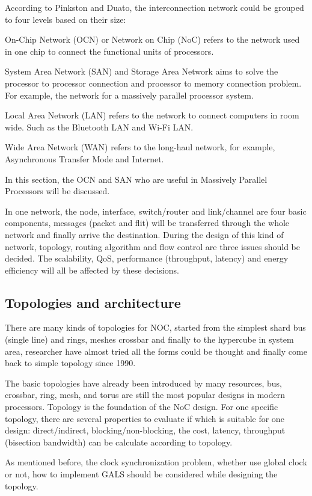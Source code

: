 \par According to Pinkston and Duato\cite{hennessy2017computer}, the interconnection network could be grouped to four levels based on their size: 
\par On-Chip Network (OCN) or Network on Chip (NoC) refers to the network used in one chip to connect the functional units of processors. 
\par System Area Network (SAN) and Storage Area Network aims to solve the processor to processor connection and processor to memory connection problem. For example, the network for a massively parallel processor system.
\par Local Area Network (LAN) refers to the network to connect computers in room wide. Such as the Bluetooth LAN and Wi-Fi LAN.
\par Wide Area Network (WAN) refers to the long-haul network, for example, Asynchronous Transfer Mode and Internet.
\par In this section, the OCN and SAN who are useful in Massively Parallel Processors will be discussed.
\par In one network, the node, interface, switch/router and link/channel are four basic components, messages (packet and flit) will be transferred through the whole network and finally arrive the destination. During the design of this kind of network, topology, routing algorithm and flow control are three issues should be decided. The scalability, QoS, performance (throughput, latency) and energy efficiency will all be affected by these decisions.

\subsection{Topologies and architecture}
\par There are many kinds of topologies for NOC, started from the simplest shard bus (single line) and rings, meshes crossbar and finally to the hypercube in system area, researcher have almost tried all the forms could be thought and finally come back to simple topology since 1990\cite{dally1990performance}\cite{hennessy2017computer}. 
\par The basic topologies have already been introduced by many resources, bus, crossbar, ring, mesh, and torus are still the most popular designs in modern processors. Topology is the foundation of the NoC design. For one specific topology, there are several properties to evaluate if which is suitable for one design: direct/indirect, blocking/non-blocking, the cost, latency, throughput (bisection bandwidth) can be calculate according to topology.
\par As mentioned before, the clock synchronization problem, whether use global clock or not, how to implement GALS should be considered while designing the topology.
